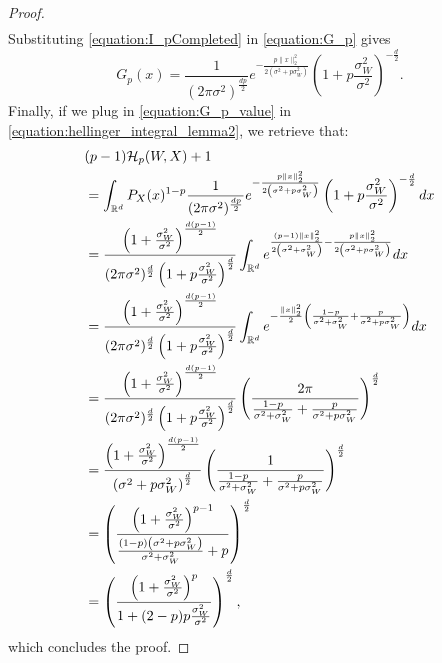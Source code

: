 \documentclass[conference]{IEEEtran}
\theoremstyle{plain}
\theoremstyle{definition}
\theoremstyle{remark}
\begin{document}
\begin{proof}
\begin{align}
\end{align}
Substituting \eqref{equation:I_pCompleted} in \eqref{equation:G_p} gives
\begin{equation}
    G_p(x)=\frac{1}{(2\pi\sigma^2)^{\frac{dp}{2}}} e^{-\frac{p\|{x}\|_2^2}{2\left(\sigma^2+p\sigma_W^2\right)}} \left(1+p\frac{\sigma_W^2}{\sigma^2}\right)^{-\frac{d}{2}}.\label{equation:G_p_value}
\end{equation}
Finally, if we plug in \eqref{equation:G_p_value} in  \eqref{equation:hellinger_integral_lemma2}, we retrieve that:
\begin{align}
    &(p-1)\mathcal{H}_p(W, X)+1 \notag \\
    &= \int_{\mathbb{R}^d} P_{{X}}({x})^{1-p} \frac{1}{(2\pi \sigma^2)^{\frac{dp}{2}}} e^{-\frac{p\|{x}\|_2^2}{2\left(\sigma^2+p\sigma_W^2\right)}} \left(1+p\frac{\sigma_W^2}{\sigma^2}\right)^{-\frac{d}{2}}d{x}\\
    &= \frac{\left(1+\frac{\sigma_W^2}{\sigma^2}\right)^{\frac{d(p-1)}{2}}}{(2\pi \sigma^2)^{\frac{d}{2}}\left(1+p\frac{\sigma_W^2}{\sigma^2}\right)^{\frac{d}{2}}}\int_{\mathbb{R}^d} e^{\frac{(p-1)\|{x}\|_2^2}{2\left(\sigma^2+\sigma_W^2\right)}-\frac{p\|{x}\|_2^2}{2\left(\sigma^2+p\sigma_W^2\right)}} d{x} \\
    &= \frac{\left(1+\frac{\sigma_W^2}{\sigma^2}\right)^{\frac{d(p-1)}{2}}}{(2\pi \sigma^2)^{\frac{d}{2}}\left(1+p\frac{\sigma_W^2}{\sigma^2}\right)^{\frac{d}{2}}}\int_{\mathbb{R}^d} e^{-\frac{\|{x}\|_2^2}{2}\left(\frac{1-p}{\sigma^2+\sigma_W^2}+\frac{p}{\sigma^2+p\sigma_W^2}\right)} d{x} \\
    &= \frac{\left(1+\frac{\sigma_W^2}{\sigma^2}\right)^{\frac{d(p-1)}{2}}}{(2\pi \sigma^2)^{\frac{d}{2}}\left(1+p\frac{\sigma_W^2}{\sigma^2}\right)^{\frac{d}{2}}} \left(\frac{2\pi}{\frac{1-p}{\sigma^2+\sigma_W^2}+\frac{p}{\sigma^2+p\sigma_W^2}}\right)^{\frac{d}{2}} \\
    &= \frac{\left(1+\frac{\sigma_W^2}{\sigma^2}\right)^{\frac{d(p-1)}{2}}}{\left(\sigma^2+p\sigma_W^2\right)^{\frac{d}{2}}} \left(\frac{1}{\frac{1-p}{\sigma^2+\sigma_W^2}+\frac{p}{\sigma^2+p\sigma_W^2}}\right)^{\frac{d}{2}} \\
    &= \left(\frac{\left(1+\frac{\sigma_W^2}{\sigma^2}\right)^{p-1}}{\frac{(1-p)\left(\sigma^2+p\sigma_W^2\right)}{\sigma^2+\sigma_W^2}+p} \right)^{\frac{d}{2}} \\
    &=  \left(\frac{\left(1+\frac{\sigma_W^2}{\sigma^2}\right)^p}{1 + (2-p)p\frac{\sigma_W^2}{\sigma^2}} \right)^{\frac{d}{2}},
\end{align}
which concludes the proof.
\end{proof}
\fi


\end{document}
